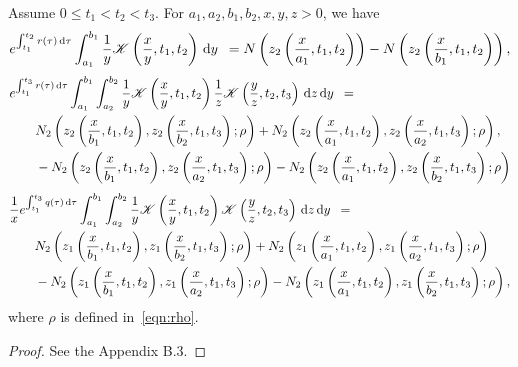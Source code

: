 	\begin{corollary}
		\label{cor:1}
		Assume $0 \leq t_1 < t_2 < t_3$. For $a_1, a_2, b_1, b_2, x,y,z > 0$, we have
		\begin{equation}
			\label{eqn:inta}
			e^{\int_{t_1}^{t_2} r(\tau) \, \mathrm d\tau}\int_{a_1}^{b_1} \frac{1}{y} \mathscr K\left( \frac{x}{y}, t_1, t_2 \right) \, \mathrm d y \enskip = N\left( z_2\left( \frac{x}{a_1},t_1,t_2 \right) \right) - N\left( z_2\left( \frac{x}{b_1},t_1,t_2 \right) \right),
		\end{equation}
		\begin{equation}
			\label{eqn:int1}
			\begin{split}
			&e^{\int_{t_1}^{t_3} r(\tau) \, \mathrm d\tau}\int_{a_1}^{b_1}\int_{a_2}^{b_2} \frac{1}{y}\mathscr K\left( \frac{x}{y}, t_1, t_2 \right) \frac{1}{z}\mathscr K\left( \frac{y}{z}, t_2, t_3 \right) \, \mathrm d z \, \mathrm d y \enskip = \\
			& \qquad  N_2\left( z_2\left( \frac{x}{b_1}, t_1, t_2 \right), z_2\left( \frac{x}{b_2}, t_1, t_3 \right); \rho  \right) + N_2\left( z_2\left( \frac{x}{a_1}, t_1, t_2 \right), z_2\left( \frac{x}{a_2}, t_1, t_3 \right); \rho  \right), \\
		&\qquad - N_2\left( z_2\left( \frac{x}{b_1}, t_1, t_2 \right), z_2\left( \frac{x}{a_2}, t_1, t_3 \right); \rho  \right) - N_2\left( z_2\left( \frac{x}{a_1}, t_1, t_2 \right), z_2\left( \frac{x}{b_2}, t_1, t_3 \right); \rho  \right)
			\end{split}
		\end{equation}
		\begin{equation}
			\label{eqn:int2}
			\begin{split}
			&\frac{1}{x}e^{\int_{t_1}^{t_3} q(\tau) \, \mathrm d\tau}\int_{a_1}^{b_1} \int_{a_2}^{b_2} \frac{1}{y}\mathscr K\left( \frac{x}{y}, t_1, t_2 \right) \mathscr K\left( \frac{y}{z}, t_2, t_3 \right) \, \mathrm d z \, \mathrm d y \enskip = \\
			& \qquad N_2\left( z_1\left( \frac{x}{b_1}, t_1, t_2 \right), z_1\left( \frac{x}{b_2}, t_1, t_3 \right); \rho  \right) + N_2\left( z_1\left( \frac{x}{a_1}, t_1, t_2 \right), z_1\left( \frac{x}{a_2}, t_1, t_3 \right); \rho  \right) \\
		&\qquad -N_2\left( z_1\left( \frac{x}{b_1}, t_1, t_2 \right), z_1\left( \frac{x}{a_2}, t_1, t_3 \right); \rho  \right) - N_2\left( z_1\left( \frac{x}{a_1}, t_1, t_2 \right), z_1\left( \frac{x}{b_2}, t_1, t_3 \right); \rho  \right)  ,
			\end{split}
		\end{equation}
		where $\rho$ is defined in~\eqref{eqn:rho}.
	\end{corollary}
\begin{proof}
	See the Appendix B.3.
\end{proof}
